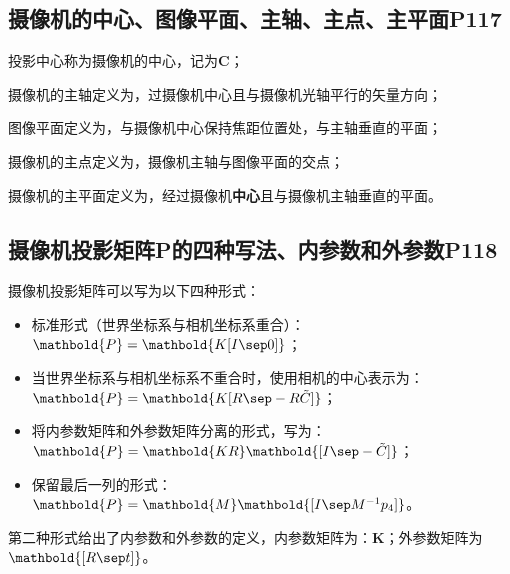 \documentclass[11pt]{article}
\begin{document}
\subsection{摄像机的中心、图像平面、主轴、主点、主平面P117}
投影中心称为摄像机的中心，记为$\mathbold{C}$；\par
摄像机的主轴定义为，过摄像机中心且与摄像机光轴平行的矢量方向；\par
图像平面定义为，与摄像机中心保持焦距位置处，与主轴垂直的平面；\par
摄像机的主点定义为，摄像机主轴与图像平面的交点；\par
摄像机的主平面定义为，经过摄像机\textbf{中心}且与摄像机主轴垂直的平面。\par
\subsection{摄像机投影矩阵P的四种写法、内参数和外参数P118}
摄像机投影矩阵可以写为以下四种形式：
\begin{itemize}
  \item 标准形式（世界坐标系与相机坐标系重合）：$\mathbold{P}=\mathbold{K[I\sep 0]}$；
  \item 当世界坐标系与相机坐标系不重合时，使用相机的中心表示为：$\mathbold{P}=\mathbold{K[R\sep -R\tilde{C}]}$；
  \item 将内参数矩阵和外参数矩阵分离的形式，写为：$\mathbold{P}=\mathbold{KR}\mathbold{[I\sep -\tilde{C}]}$；
  \item 保留最后一列的形式：$\mathbold{P}=\mathbold{M}\mathbold{[I\sep M^{-1}p_4]}$。
\end{itemize}\par
第二种形式给出了内参数和外参数的定义，内参数矩阵为：$\mathbold{K}$；外参数矩阵为$\mathbold{[R\sep t]}$。
\end{document}
